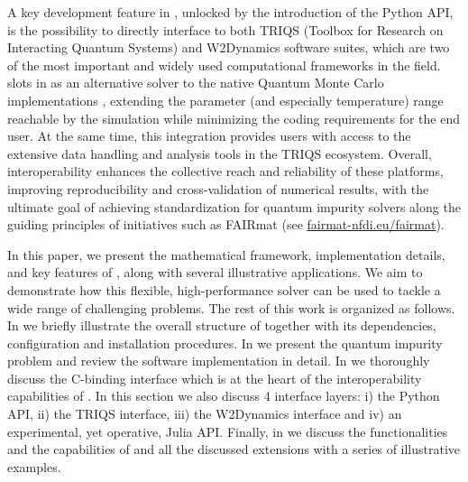 \documentclass[edipack_sp.tex]{subfiles}
\begin{document}
A key development feature in \NAME, unlocked by the introduction of the Python API, 
is the possibility to directly interface to both TRIQS \cite{Parcollet2015CPC} (Toolbox for Research on Interacting Quantum Systems) and
W2Dynamics \cite{Wallerberger2019CPC} software suites, which are two of the most important and widely used computational frameworks in the field.
\NAME slots in as an alternative solver to the native Quantum Monte Carlo 
implementations \cite{Gull2011RMP,Seth2016CPC}, extending the parameter (and especially temperature) range reachable by 
the simulation while minimizing the coding requirements for the end user.
At the same time, this integration provides \NAME users with access to the
extensive data handling and analysis tools in the TRIQS ecosystem. 
Overall, interoperability enhances the collective reach and reliability of these platforms, 
improving reproducibility and cross-validation of numerical results, with the ultimate goal of achieving standardization for quantum impurity solvers along the guiding principles of initiatives such as FAIRmat (see \href{https://www.fairmat-nfdi.eu/fairmat/}{fairmat-nfdi.eu/fairmat}). 


In this paper, we present the mathematical framework, implementation
details, and key features of \NAME, along with several illustrative
applications. We aim to demonstrate how this flexible,
high-performance solver can be used to tackle a wide range of
challenging problems. 
The rest of this work is organized as follows. In  we 
briefly illustrate the overall structure of \NAME together with its dependencies, configuration
and installation procedures. In  we present the quantum impurity
problem and review the software implementation in detail. In  we thoroughly discuss the C-binding interface which is at the heart of the 
interoperability capabilities of \NAME. In this section we also discuss 4 interface layers: i) 
the Python API, ii) the TRIQS interface, iii) the W2Dynamics interface and iv) an experimental, yet operative, Julia API.
Finally, in  we discuss the functionalities and the capabilities of \NAME and  all the discussed extensions with a series of illustrative examples. 

\ifSubfilesClassLoaded{
  
}{}
\end{document}
